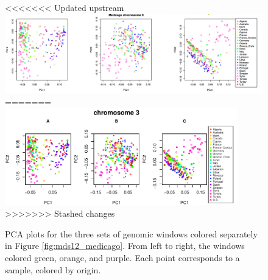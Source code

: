 \documentclass[11pt, oneside]{article}   	%
\begin{document}
\begin{figure}
    \begin{center}
<<<<<<< Updated upstream
       \includegraphics{medicago_peaks_pca}
=======
       \includegraphics[width=0.9\textwidth]{Fig7_pca_plots_for_Medicago_chr3_3peaks_byMDS}
>>>>>>> Stashed changes
    \end{center}
    \caption{
        PCA plots for the three sets of genomic windows colored separately in Figure \ref{fig:mds12_medicago}. 
        From left to right, the windows colored green, orange, and purple. Each point corresponds to a sample, colored by origin.
        \label{fig:pca_medicago}
    }
\end{figure}
\end{document}
